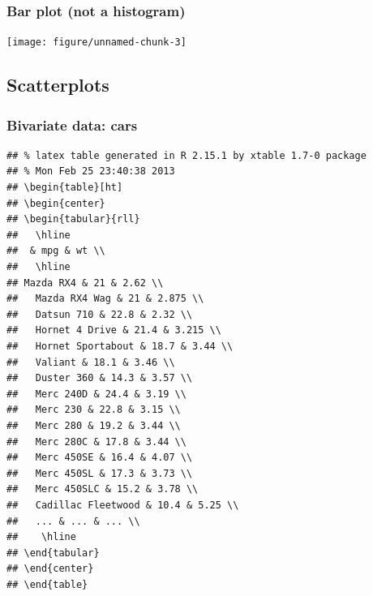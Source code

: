 \documentclass[handout]{beamer}\usepackage{graphicx, color}
\makeatletter
\newenvironment{kframe}{%
 \def\at@end@of@kframe{}%
 \ifinner\ifhmode%
  \def\at@end@of@kframe{\end{minipage}}%
  \begin{minipage}{\columnwidth}%
 \fi\fi%
 \def\FrameCommand##1{\hskip\@totalleftmargin \hskip-\fboxsep
 \colorbox{shadecolor}{##1}\hskip-\fboxsep
     \hskip-\linewidth \hskip-\@totalleftmargin \hskip\columnwidth}%
 \MakeFramed {\advance\hsize-\width
   \@totalleftmargin\z@ \linewidth\hsize
   \@setminipage}}%
 {\par\unskip\endMakeFramed%
 \at@end@of@kframe}
\newenvironment{knitrout}{}{} %
\numberwithin{equation}{section}
\makeatother
\begin{document}
\begin{frame}[fragile]
\frametitle{Bar plot (not a histogram)}
\begin{knitrout}
\color{fgcolor}
\texttt{[image: figure/unnamed-chunk-3]} 

\end{knitrout}

\end{frame}



\subsection{Scatterplots}

\begin{frame}[fragile]
\frametitle{Bivariate data: cars}
\begin{knitrout}
\color{fgcolor}\begin{kframe}
\begin{verbatim}
## % latex table generated in R 2.15.1 by xtable 1.7-0 package
## % Mon Feb 25 23:40:38 2013
## \begin{table}[ht]
## \begin{center}
## \begin{tabular}{rll}
##   \hline
##  & mpg & wt \\ 
##   \hline
## Mazda RX4 & 21 & 2.62 \\ 
##   Mazda RX4 Wag & 21 & 2.875 \\ 
##   Datsun 710 & 22.8 & 2.32 \\ 
##   Hornet 4 Drive & 21.4 & 3.215 \\ 
##   Hornet Sportabout & 18.7 & 3.44 \\ 
##   Valiant & 18.1 & 3.46 \\ 
##   Duster 360 & 14.3 & 3.57 \\ 
##   Merc 240D & 24.4 & 3.19 \\ 
##   Merc 230 & 22.8 & 3.15 \\ 
##   Merc 280 & 19.2 & 3.44 \\ 
##   Merc 280C & 17.8 & 3.44 \\ 
##   Merc 450SE & 16.4 & 4.07 \\ 
##   Merc 450SL & 17.3 & 3.73 \\ 
##   Merc 450SLC & 15.2 & 3.78 \\ 
##   Cadillac Fleetwood & 10.4 & 5.25 \\ 
##   ... & ... & ... \\ 
##    \hline
## \end{tabular}
## \end{center}
## \end{table}
\end{verbatim}
\end{kframe}
\end{knitrout}

\end{frame}
\end{document}
